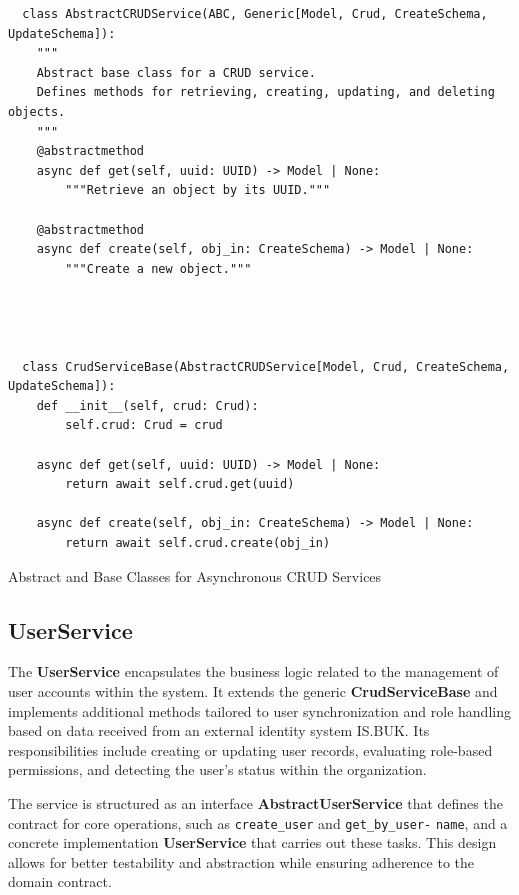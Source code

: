 \begin{listing}[t]
  \begin{verbatim}
  class AbstractCRUDService(ABC, Generic[Model, Crud, CreateSchema, UpdateSchema]):
    """
    Abstract base class for a CRUD service.
    Defines methods for retrieving, creating, updating, and deleting objects.
    """
    @abstractmethod
    async def get(self, uuid: UUID) -> Model | None:
        """Retrieve an object by its UUID."""
    
    @abstractmethod
    async def create(self, obj_in: CreateSchema) -> Model | None:
        """Create a new object."""




  class CrudServiceBase(AbstractCRUDService[Model, Crud, CreateSchema, UpdateSchema]):
    def __init__(self, crud: Crud):
        self.crud: Crud = crud
    
    async def get(self, uuid: UUID) -> Model | None:
        return await self.crud.get(uuid)

    async def create(self, obj_in: CreateSchema) -> Model | None:
        return await self.crud.create(obj_in)  

\end{verbatim}
\caption{Abstract and Base Classes for Asynchronous CRUD Services}
\label{list:crud-service-base}
\end{listing}

\subsection{UserService}

The \textbf{UserService} encapsulates the business logic related to the management of user accounts within the system. It extends the generic \textbf{CrudServiceBase} and implements additional methods tailored to user synchronization and role handling based on data received from an external identity system IS.BUK. Its responsibilities include creating or updating user records, evaluating role-based permissions, and detecting the user's status within the organization.

The service is structured as an interface \textbf{AbstractUserService} that defines the contract for core operations, such as \texttt{create\_user} and \texttt{get\_by\_user-} \texttt{name}, and a concrete implementation \textbf{UserService} that carries out these tasks. This design allows for better testability and abstraction while ensuring adherence to the domain contract.

